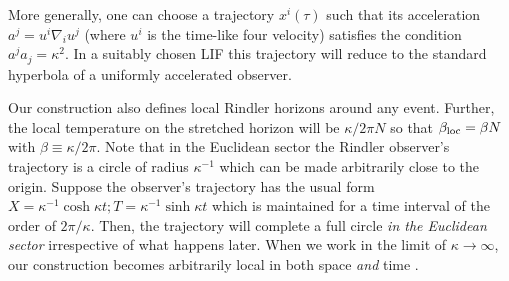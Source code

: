 \documentclass[12pt]{iopart}
\begin{document}
 
 More generally, one  can choose a trajectory $x^i(\tau)$ such that its acceleration $a^j=u^i\nabla_i u^j$ (where $u^i$ is the time-like four velocity) satisfies the condition
 $a^ja_j =\kappa^2$. In a suitably chosen LIF this trajectory will reduce to the standard hyperbola of a uniformly accelerated observer. 
 
 
 Our construction also defines local Rindler horizons around any event.
 Further, the local temperature   on the stretched horizon will be $\kappa/2\pi N$ so that 
$\beta_{\rm loc} = \beta N$ with $\beta \equiv \kappa/2\pi$.
Note that in the Euclidean sector the Rindler observer's trajectory is a circle of radius $\kappa^{-1}$ which can be made arbitrarily close to the origin. Suppose the observer's trajectory has the usual form $X=\kappa^{-1}\cosh \kappa t; T=\kappa^{-1}\sinh \kappa t$ which is maintained for a time interval  of the order of $ 2\pi/\kappa$. Then, the trajectory will complete a full circle \textit{in the Euclidean sector} irrespective of what happens later. When we work in the limit of $\kappa\to\infty$, our construction becomes arbitrarily local in both space \textit{and} time \cite{loctemp,dawood-paddy-varg}. 
 
\end{document}

